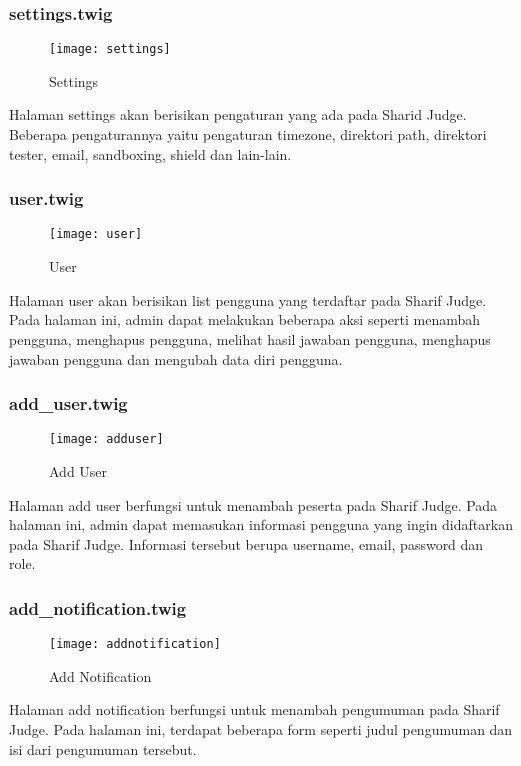 \subsubsection{settings.twig}
\begin{figure}[H]
	\centering  
	\texttt{[image: settings]}  
	\caption[Settings]{Settings} 
	\label{fig:settings} 
\end{figure} 
Halaman settings akan berisikan pengaturan yang ada pada Sharid Judge. Beberapa pengaturannya yaitu pengaturan timezone, direktori path, direktori tester, email, sandboxing, shield dan lain-lain.

\subsubsection{user.twig}
\begin{figure}[H]
	\centering  
	\texttt{[image: user]}  
	\caption[User]{User} 
	\label{fig:user} 
\end{figure} 
Halaman user akan berisikan list pengguna yang terdaftar pada Sharif Judge. Pada halaman ini, admin dapat melakukan beberapa aksi seperti menambah pengguna, menghapus pengguna, melihat hasil jawaban pengguna, menghapus jawaban pengguna dan mengubah data diri pengguna. 

\subsubsection{add\_user.twig}
\begin{figure}[H]
	\centering  
	\texttt{[image: adduser]}  
	\caption[Add User]{Add User} 
	\label{fig:adduser} 
\end{figure} 
Halaman add user berfungsi untuk menambah peserta pada Sharif Judge. Pada halaman ini, admin dapat memasukan informasi pengguna yang ingin didaftarkan pada Sharif Judge. Informasi tersebut berupa username, email, password dan role.

\subsubsection{add\_notification.twig}
\begin{figure}[H]
	\centering  
	\texttt{[image: addnotification]}  
	\caption[Add Notification]{Add Notification} 
	\label{fig:addnotification} 
\end{figure} 
Halaman add notification berfungsi untuk menambah pengumuman pada Sharif Judge. Pada halaman ini, terdapat beberapa form seperti judul pengumuman dan isi dari pengumuman tersebut.  

